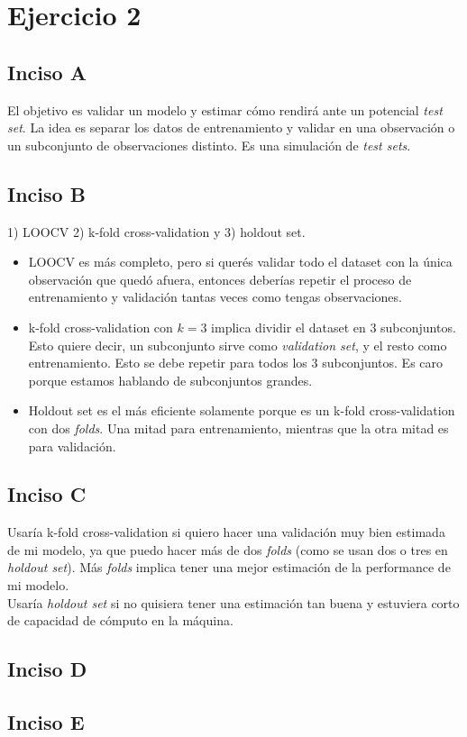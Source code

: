 \documentclass{article}
\begin{document}
    \section*{Ejercicio 2}
        \subsection*{Inciso A}
            El objetivo es validar un modelo y estimar cómo rendirá ante un potencial \textit{test set}. La idea es separar los datos de entrenamiento y validar en una observación o un subconjunto de observaciones distinto. Es una simulación de \textit{test sets}.
        \subsection*{Inciso B}
            1) LOOCV 2) k-fold cross-validation y 3) holdout set.
            \begin{itemize}
                \item LOOCV es más completo, pero si querés validar todo el dataset con la única observación que quedó afuera, entonces deberías repetir el proceso de entrenamiento y validación tantas veces como tengas observaciones.
                \item k-fold cross-validation con $k = 3$ implica dividir el dataset en 3 subconjuntos. Esto quiere decir, un subconjunto sirve como \textit{validation set}, y el resto como entrenamiento. Esto se debe repetir para todos los 3 subconjuntos. Es caro porque estamos hablando de subconjuntos grandes.
                \item Holdout set es el más eficiente solamente porque es un k-fold cross-validation con dos \textit{folds}. Una mitad para entrenamiento, mientras que la otra mitad es para validación.
            \end{itemize}
        \subsection*{Inciso C}
            Usaría k-fold cross-validation si quiero hacer una validación muy bien estimada de mi modelo, ya que puedo hacer más de dos \textit{folds} (como se usan dos o tres en \textit{holdout set}). Más \textit{folds} implica tener una mejor estimación de la performance de mi modelo. \\
            Usaría \textit{holdout set} si no quisiera tener una estimación tan buena y estuviera corto de capacidad de cómputo en la máquina.
        \subsection*{Inciso D}
        \subsection*{Inciso E}
\end{document}

